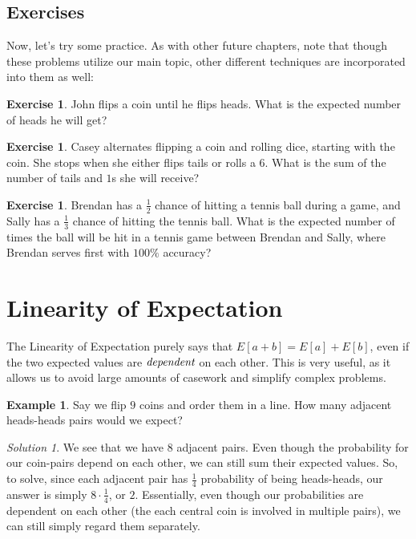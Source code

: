 \documentclass[letterpaper]{article}
\theoremstyle{definition}
\newtheorem{example}[thm]{Example}
\theoremstyle{remark}
\newtheorem*{solution}{Solution}
\theoremstyle{definition}
\newtheorem{exercise}[thm]{Exercise}
\begin{document}
\subsection*{Exercises}
Now, let's try some practice. As with other future chapters, note that though these problems utilize our main topic, other different techniques are incorporated into them as well:

\begin{exercise}
    John flips a coin until he flips heads. What is the expected number of heads he will get?
\end{exercise}

\begin{exercise}
    Casey alternates flipping a coin and rolling dice, starting with the coin. She stops when she either flips tails or rolls a $6$. What is the sum of the number of tails and $1$s she will receive?
\end{exercise}

\begin{exercise}
    Brendan has a $\frac{1}{2}$ chance of hitting a tennis ball during a game, and Sally has a $\frac{1}{3}$ chance of hitting the tennis ball. What is the expected number of times the ball will be hit in a tennis game between Brendan and Sally, where Brendan serves first with $100\%$ accuracy?
\end{exercise}

\section{Linearity of Expectation}
The Linearity of Expectation purely says that $E[a+b] = E[a] + E[b]$, even if the two expected values are $\emph{dependent}$ on each other. This is very useful, as it allows us to avoid large amounts of casework and simplify complex problems.

\begin{example}
Say we flip $9$ coins and order them in a line. How many adjacent heads-heads pairs would we expect?
\end{example}

\begin{solution}
We see that we have $8$ adjacent pairs. Even though the probability for our coin-pairs depend on each other, we can still sum their expected values. So, to solve, since each adjacent pair has $\frac{1}{4}$ probability of being heads-heads, our answer is simply $8\cdot\frac{1}{4}$, or $2$. Essentially, even though our probabilities are dependent on each other (the each central coin is involved in multiple pairs), we can still simply regard them separately.\\
\end{solution}
\end{document}
